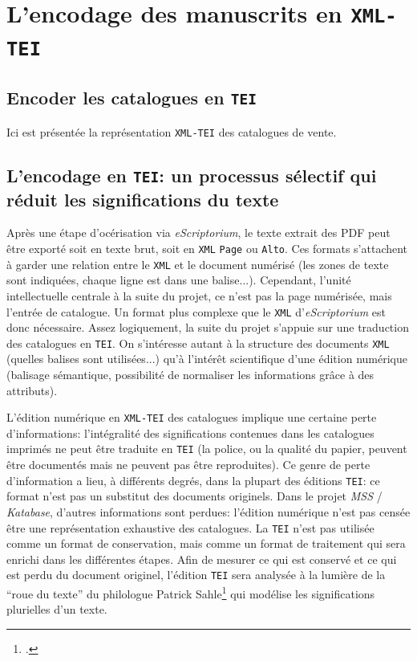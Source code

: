 \documentclass[a4paper, 12pt, twoside]{book}
\newcommand{\alto}{\texttt{Alto}}
\newcommand{\escr}{\textit{eScriptorium}}
\newcommand{\ktb}{\textit{Katabase}}
\newcommand{\mss}{\textit{MSS}}
\newcommand{\mssktb}{\mss{} / \ktb{}}
\newcommand{\tei}{\texttt{TEI}}
\newcommand{\xml}{\texttt{XML}}
\newcommand{\xmltei}{\texttt{XML-TEI}}
\begin{document}
\section{L'encodage des manuscrits en \xmltei{}}
\subsection{Encoder les catalogues en \tei{}}
Ici est présentée la représentation \xmltei{} des catalogues de vente.

\subsection{L'encodage en \tei{}: un processus sélectif qui réduit les significations du texte}
Après une étape d'océrisation via \escr{}, le texte extrait des PDF peut être exporté soit en texte brut, soit en \xml{} \texttt{Page} ou \alto{}. Ces formats s'attachent à garder une relation entre le \xml{} et le document numérisé (les zones de texte sont indiquées, chaque ligne est dans une balise...). Cependant, l'unité intellectuelle centrale à la suite du projet, ce n'est pas la page numérisée, mais l'entrée de catalogue. Un format plus complexe que le \xml{} d'\escr{} est donc nécessaire. Assez logiquement, la suite du projet s'appuie sur une traduction des catalogues en \tei{}. On s'intéresse autant à la structure des documents \xml{} (quelles balises sont utilisées...) qu'à l'intérêt scientifique d'une édition numérique (balisage sémantique, possibilité de normaliser les informations grâce à des attributs).

L'édition numérique en \xmltei{} des catalogues implique une certaine perte d'informations: l'intégralité des significations contenues dans les catalogues imprimés ne peut être traduite en \tei{} (la police, ou la qualité du papier, peuvent être documentés mais ne peuvent pas être reproduites). Ce genre de perte d'information a lieu, à différents degrés, dans la plupart des éditions \tei{}: ce format n'est pas un substitut des documents originels. Dans le projet \mssktb{}, d'autres informations sont perdues: l'édition numérique n'est pas censée être une représentation exhaustive des catalogues. La \tei{} n'est pas utilisée comme un format de conservation, mais comme un format de traitement qui sera enrichi dans les différentes étapes. Afin de mesurer ce qui est conservé et ce qui est perdu du document originel, l'édition \tei{} sera analysée à la lumière de la \enquote{roue du texte} du philologue Patrick Sahle\footcite[p. 11]{sahle_digital_2016} qui modélise les significations plurielles d'un texte.
\end{document}
